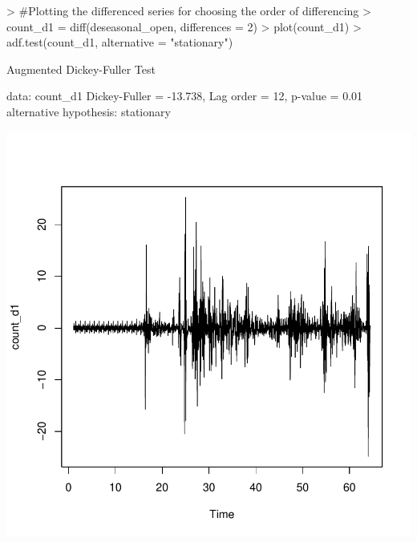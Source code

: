 \documentclass{article}
\begin{document}
\begin{Schunk}
\begin{Sinput}
> #Plotting the differenced series for choosing the order of differencing
> count_d1 = diff(deseasonal_open, differences = 2)
> plot(count_d1)
> adf.test(count_d1, alternative = "stationary")
\end{Sinput}
\begin{Soutput}
	Augmented Dickey-Fuller Test

data:  count_d1
Dickey-Fuller = -13.738, Lag order = 12, p-value = 0.01
alternative hypothesis: stationary
\end{Soutput}
\end{Schunk}
\includegraphics{Report-014}
\end{document}
